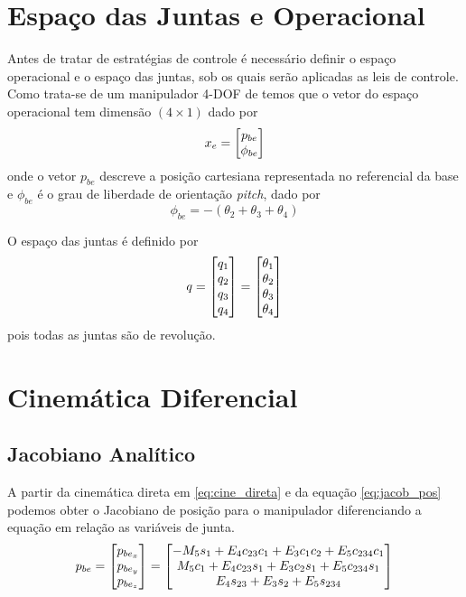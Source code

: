 \section{Espaço das Juntas e Operacional}
Antes de tratar de estratégias de controle é necessário definir o espaço operacional e o espaço das juntas,  sob os quais serão aplicadas as leis de controle. 
Como trata-se de um manipulador 4-DOF de temos que o vetor do espaço operacional tem dimensão $(4 \times 1)$ dado por 
\begin{equation} \label{eq:operational_space}
{x_e} = \begin{bmatrix}{p}_{be} \\ \phi_{be}\end{bmatrix}
\end{equation}
onde o vetor $p_{be}$ descreve a posição cartesiana representada no referencial da base e $\phi_{be}$ é o grau de liberdade de orientação \textit{pitch}, dado por
\begin{equation} \label{eq:orientacao}
\phi_{be} = -(\theta_2 + \theta_3 + \theta_4)
\end{equation}

O espaço das juntas é definido por 
\begin{equation} \label{joint_space}
{q} = \begin{bmatrix}q_1 \\ q_2 \\ q_3 \\ q_4\end{bmatrix} = \begin{bmatrix}\theta_1 \\ \theta_2 \\ \theta_3 \\ \theta_4  \end{bmatrix}
\end{equation} 
pois todas as juntas são de revolução.

\section{Cinemática Diferencial}

\subsection{Jacobiano Analítico}
A partir da cinemática direta em \eqref{eq:cine_direta} e da equação \ref{eq:jacob_pos} podemos obter o Jacobiano de posição para o manipulador diferenciando a equação em relação as variáveis de junta. 
\begin{equation}
{p}_{be} = \begin{bmatrix}p_{be_x} \\ p_{be_y} \\ p_{be_z}\end{bmatrix} =
\begin{bmatrix}
   -M_5 s_1 + E_4 c_{23}c_1 + E_3 c_1 c_2 + E_5 c_{234} c_1 \\
     M_5 c_1+E_4 c_{23} s_1 + E_3 c_2 s_1 + E_5 c_{234} s_1 \\
   						 E_4 s_{23} + E_3 s_2 + E_5 s_{234} \\
\end{bmatrix}
\end{equation}

